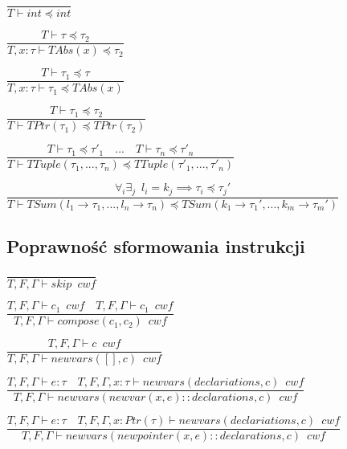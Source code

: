 \documentclass{article}
\begin{document}
\centerline{$\dfrac{}{T \vdash int \preceq int}$}\vspace{5pt}

\centerline{$\dfrac{T \vdash \tau \preceq \tau_2}{T, x : \tau \vdash TAbs(x) \preceq \tau_2 }$}\vspace{5pt}

\centerline{$\dfrac{T \vdash \tau_1 \preceq \tau}{T, x : \tau \vdash \tau_1 \preceq TAbs(x) }$}\vspace{5pt}

\centerline{$\dfrac{T \vdash \tau_1 \preceq \tau_2}{T \vdash TPtr(\tau_1) \preceq TPtr(\tau_2) }$}\vspace{5pt}

\centerline{$\dfrac{T \vdash \tau_1 \preceq \tau'_1 \quad ... \quad T \vdash \tau_n \preceq \tau'_n}{T \vdash TTuple(\tau_1, ..., \tau_n) \preceq TTuple(\tau'_1, ..., \tau'_n) }$}\vspace{5pt}

\centerline{$\dfrac{\forall_{i} \exists_{j} \enspace l_i = k_j \implies \tau_i \preceq \tau_j'}{T \vdash TSum(l_1 \rightarrow \tau_1, ...,
l_n \rightarrow \tau_n) \preceq TSum(k_1 \rightarrow \tau_1', ...,
k_m \rightarrow \tau_m')}$}\vspace{5pt}

\subsection{Poprawność sformowania instrukcji}


\centerline{$\dfrac{}{T, F, \Gamma \vdash skip \enspace cwf} $}\vspace{5pt}
\centerline{$\dfrac{T, F, \Gamma \vdash c_1 \enspace cwf \quad T, F, \Gamma \vdash c_1 \enspace cwf}{T, F, \Gamma \vdash compose(c_1, c_2) \enspace cwf} $}\vspace{5pt}

\centerline{$\dfrac{T, F, \Gamma \vdash c \enspace cwf}{T, F, \Gamma \vdash newvars([], c) \enspace cwf  }$}\vspace{5pt}

\centerline{$\dfrac{T, F, \Gamma \vdash e : \tau \quad T, F, \Gamma, x : \tau \vdash newvars(declariations, c) \enspace cwf}{T, F, \Gamma \vdash newvars(newvar(x, e) :: declarations, c) \enspace cwf  }$}\vspace{5pt}

\centerline{$\dfrac{T, F, \Gamma \vdash e : \tau \quad T, F, \Gamma, x : Ptr(\tau) \vdash newvars(declariations, c) \enspace cwf}{T, F, \Gamma \vdash newvars(newpointer(x, e) :: declarations, c) \enspace cwf  }$}\vspace{5pt}
\end{document}
